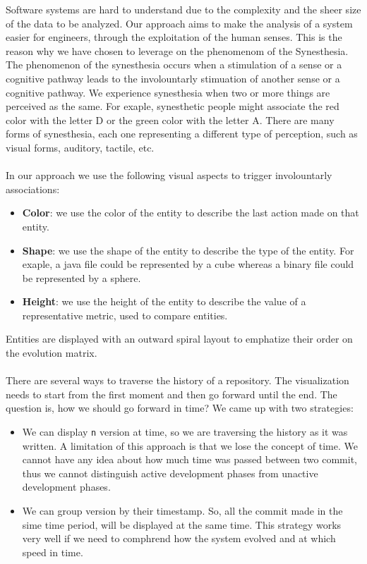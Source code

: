 Software systems are hard to understand due to the complexity and the sheer size of the data to be analyzed.
Our approach aims to make the analysis of a system easier for engineers, through the exploitation of the human senses.
This is the reason why we have chosen to leverage on the phenomenom of the Synesthesia.
The phenomenon of the synesthesia occurs  when a stimulation of a sense or a cognitive pathway leads to the involountarly stimuation of another sense or a cognitive pathway.
We experience synesthesia when two or more things are perceived as the same. 
For exaple, synesthetic people might associate the red color with the letter D or the green color with the letter A. 
There are many forms of synesthesia, each one representing a different type of perception, such as visual forms, auditory, tactile, etc.\\
\\
In our approach we use the following visual aspects to trigger involountarly associations:
\begin{itemize}
    \item \textbf{Color}: we use the color of the entity to describe the last action made on that entity.
    \item \textbf{Shape}: we use the shape of the entity to describe the type of the entity. 
    For exaple, a java file could be represented by a cube whereas a binary file could be represented by a sphere.
    \item \textbf{Height}: we use the height of the entity to describe the value of a representative metric, used to compare entities.
\end{itemize}
Entities are displayed with an outward spiral layout to emphatize their order on the evolution matrix. \\
\\
There are several ways to traverse the history of a repository. 
The visualization needs to start from the first moment and then go forward until the end. The question is, how we should go forward in time?
We came up with two strategies: 
\begin{itemize}
    \item We can display \texttt{n} version at time, so we are traversing the history as it was written. 
    A limitation of this approach is that we lose the concept of time. 
    We cannot have any idea about how much time was passed between two commit, thus we cannot distinguish active development phases from unactive development phases. 

    \item We can group version by their timestamp. So, all the commit made in the sime time period, will be displayed at the same time. 
    This strategy works very well if we need to comphrend how the system evolved and at which speed in time. 
\end{itemize}

